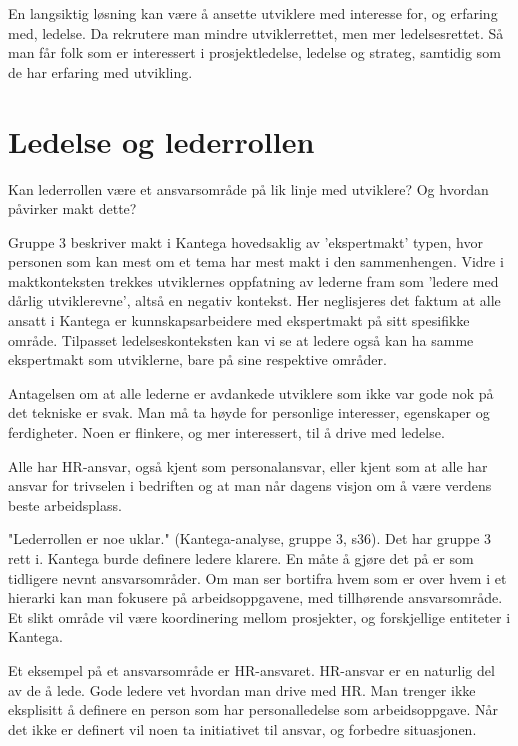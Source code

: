 \documentclass[12pt, a4paper]{article}
\begin{document}
En langsiktig løsning kan være å ansette utviklere med interesse for, og
erfaring med, ledelse. Da rekrutere man mindre utviklerrettet, men mer ledelsesrettet. 
Så man får folk som er interessert i prosjektledelse, ledelse og strateg,
samtidig som de har erfaring med utvikling. 

\section{Ledelse og lederrollen}\label{ledelse}
Kan lederrollen være et ansvarsområde på lik linje med
utviklere? Og hvordan påvirker makt dette? 

Gruppe 3 beskriver makt i Kantega hovedsaklig av 'ekspertmakt' typen, hvor
personen som kan mest om et tema har mest makt i den sammenhengen. Vidre i
maktkonteksten trekkes utviklernes oppfatning av lederne fram som 'ledere med
dårlig utviklerevne', altså en negativ kontekst. Her neglisjeres det faktum at
alle ansatt i Kantega er kunnskapsarbeidere med ekspertmakt på sitt spesifikke
område. Tilpasset ledelseskonteksten kan vi se at ledere også kan ha samme
ekspertmakt som utviklerne, bare på sine respektive områder. 

Antagelsen om at alle lederne er avdankede utviklere som ikke var gode nok på
det tekniske er svak. Man må ta høyde for personlige interesser, egenskaper og
ferdigheter. Noen er flinkere, og mer interessert, til å drive med ledelse.


Alle har HR-ansvar, også kjent som personalansvar, eller kjent som at alle har
ansvar for trivselen i bedriften og at man når dagens visjon om å være verdens
beste arbeidsplass.

"Lederrollen er noe uklar." (Kantega-analyse, gruppe 3, s36). Det har gruppe 3
rett i. Kantega burde definere ledere klarere. En måte å gjøre det på er som
tidligere nevnt ansvarsområder. Om man ser bortifra hvem som er over hvem i et
hierarki kan man fokusere på arbeidsoppgavene, med tillhørende ansvarsområde.
Et slikt område vil være koordinering mellom prosjekter, og forskjellige
entiteter i Kantega. 

Et eksempel på et ansvarsområde er HR-ansvaret. HR-ansvar er en naturlig del av
de å lede. Gode ledere vet hvordan man drive med HR. Man
trenger ikke eksplisitt å definere en person som har personalledelse som arbeidsoppgave.
Når det ikke er definert vil noen ta initiativet til ansvar, og forbedre
situasjonen. 
\end{document}
